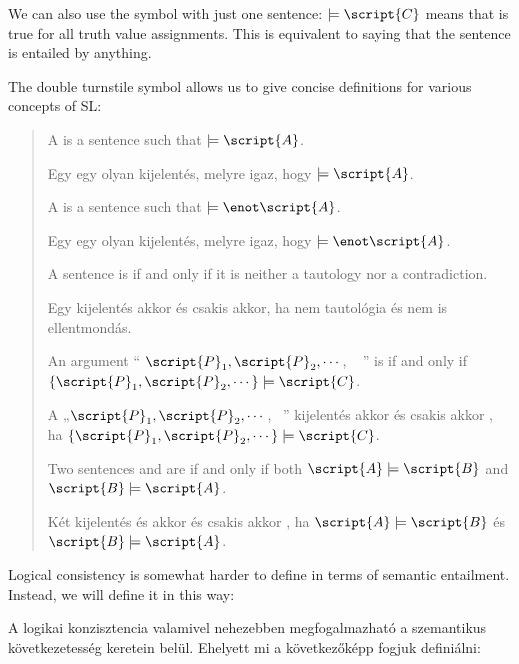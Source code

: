 We can also use the symbol with just one sentence: $\models\script{C}$ means that  is true for all truth value assignments. This is equivalent to saying that the sentence is entailed by anything.

The double turnstile symbol allows us to give concise definitions for various concepts of SL:



\begin{quote}
A  is a sentence   such that $\models\script{A}$.

Egy  egy olyan  kijelentés, melyre igaz, hogy $\models\script{A}$.

A  is a sentence  such that $\models\enot\script{A}$.

Egy   egy olyan  kijelentés, melyre igaz, hogy $\models\enot\script{A}$.

A sentence is  if and only if it is neither a tautology nor a contradiction.

Egy kijelentés  akkor és csakis akkor, ha nem tautológia és nem is ellentmondás.

An argument `` $\script{P}_1, \script{P}_2, \cdots$, \therefore\  '' is  if and only if $\{\script{P}_1,\script{P}_2,\cdots\}\models\script{C}$.

A „$\script{P}_1, \script{P}_2, \cdots$, \therefore\ ” kijelentés akkor és csakis akkor , ha $\{\script{P}_1,\script{P}_2,\cdots\}\models\script{C}$.

Two sentences  and  are  if and only if both $\script{A}\models\script{B}$ and $\script{B}\models\script{A}$.

Két kijelentés  és  akkor és csakis akkor , ha $\script{A}\models\script{B}$ és $\script{B}\models\script{A}$.
\end{quote}

Logical consistency is somewhat harder to define in terms of semantic entailment. Instead, we will define it in this way:

A logikai konzisztencia valamivel nehezebben megfogalmazható a szemantikus következetesség keretein belül. Ehelyett mi a következőképp fogjuk definiálni:

